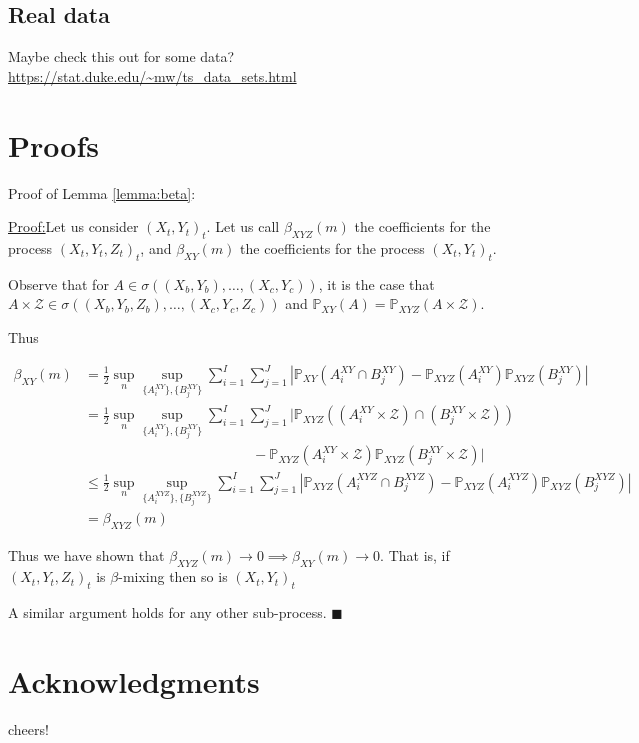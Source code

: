 \documentclass{article}
\newenvironment{claimproof}[1]{\par\noindent\underline{Proof:}\space#1}{\hfill $\blacksquare$}
\begin{document}
\subsection{Real data}
Maybe check this out for some data? \url{https://stat.duke.edu/~mw/ts_data_sets.html}

\section{Proofs}
Proof of Lemma \ref{lemma:beta}:
\begin{claimproof} Let us consider $(X_t,Y_t)_t$.
Let us call $\beta_{XYZ}(m)$ the coefficients for the process $(X_t,Y_t,Z_t)_t$, and $\beta_{XY}(m)$ the coefficients for the process $(X_t,Y_t)_t$. 

Observe that for $A \in \sigma((X_b,Y_b),\ldots, (X_c,Y_c))$, it is the case that $A \times \mathcal{Z} \in \sigma((X_b,Y_b,Z_b),\ldots, (X_c,Y_c,Z_c))$ and $\mathbb{P}_{XY}(A) = \mathbb{P}_{XYZ}(A\times \mathcal{Z})$.

Thus

\begin{align*}
\beta_{XY}(m) &= \frac{1}{2} \sup_n \sup_{ \{A_i^{XY} \}, \{B_j^{XY} \} } \sum_{i=1}^I \sum_{j=1}^J | \mathbb{P}_{XY}(A_i^{XY} \cap B_j^{XY}) - \mathbb{P}_{XYZ}(A_i^{XY})\mathbb{P}_{XYZ}(B_j^{XY})| \\
&= \frac{1}{2} \sup_n \sup_{ \{A_i^{XY} \}, \{B_j^{XY} \} } \sum_{i=1}^I \sum_{j=1}^J | \mathbb{P}_{XYZ}((A_i^{XY}\times \mathcal{Z}) \cap (B_j^{XY} \times \mathcal{Z})) \\& \quad \quad\quad \quad \quad \quad\quad \quad \quad \quad\quad \quad- \mathbb{P}_{XYZ}(A_i^{XY}\times \mathcal{Z})\mathbb{P}_{XYZ}(B_j^{XY} \times \mathcal{Z})| \\
& \leq \frac{1}{2} \sup_n \sup_{ \{A_i^{XYZ} \}, \{B_j^{XYZ} \} } \sum_{i=1}^I \sum_{j=1}^J | \mathbb{P}_{XYZ}(A_i^{XYZ} \cap B_j^{XYZ}) - \mathbb{P}_{XYZ}(A_i^{XYZ})\mathbb{P}_{XYZ}(B_j^{XYZ})| \\
& = \beta_{XYZ}(m)
\end{align*}

Thus we have shown that  $\beta_{XYZ}(m) \longrightarrow 0 \implies \beta_{XY}(m) \longrightarrow 0$. That is, if  $(X_t,Y_t,Z_t)_t$ is $\beta$-mixing then so is  $(X_t,Y_t)_t$ 

A similar argument holds for any other sub-process.
\end{claimproof}

\section*{Acknowledgments} 
cheers!


\end{document}
